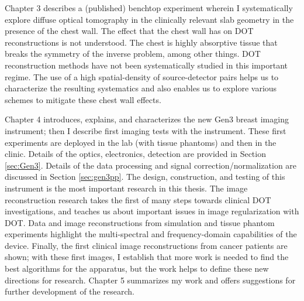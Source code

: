 Chapter 3 describes a (published) benchtop experiment wherein I systematically explore diffuse optical tomography in the clinically relevant slab geometry in the presence of the chest wall. The effect that the chest wall has on DOT reconstructions is not understood. The chest is highly absorptive tissue that breaks the symmetry of the inverse problem, among other things. DOT reconstruction methods have not been systematically studied in this important regime. The use of a high spatial-density of source-detector pairs helps us to characterize the resulting systematics and also enables us to explore various schemes to mitigate these chest wall effects.

Chapter 4 introduces, explains, and characterizes the new Gen3 breast imaging instrument; then I describe first imaging tests with the instrument. These first experiments are deployed in the lab (with tissue phantoms) and then in the clinic. Details of the optics, electronics, detection are provided in Section \ref{sec:Gen3}. Details of the data processing and signal correction/normalization are discussed in Section \ref{sec:gen3pp}. The design, construction, and testing of this instrument is the most important research in this thesis. The image reconstruction research takes the first of many steps towards clinical DOT investigations, and teaches us about important issues in image regularization with DOT.  Data and image reconstructions from simulation and tissue phantom experiments highlight the multi-spectral and frequency-domain capabilities of the device. Finally, the first clinical image reconstructions from cancer patients are shown; with these first images, I establish that more work is needed to find the best algorithms for the apparatus, but the work helps to define these new directions for research. Chapter 5 summarizes my work and offers suggestions for further development of the research.
